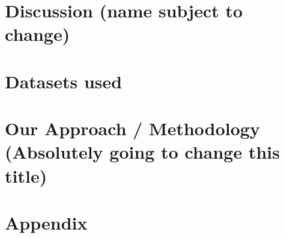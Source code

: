 \documentclass[oneside, a4paper, onecolumn, 11pt]{article}
\begin{document}
\section{Discussion (name subject to change)} %

\section{Datasets used}


\section{Our Approach / Methodology (Absolutely going to change this title)}

\newpage
\nocite{*}



\newpage
\appendix

\section{Appendix}
\label{sec:appendix}
\end{document}
